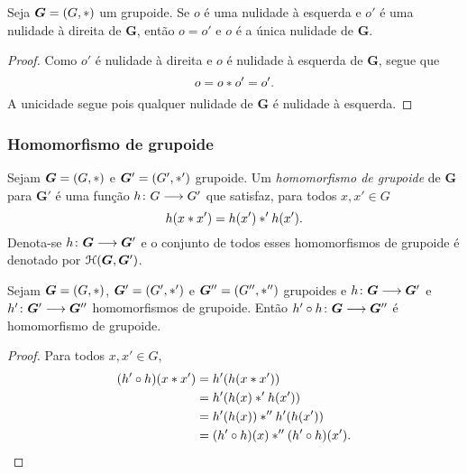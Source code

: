 \begin{proposition}
\label{prop:unic.nulidade}
Seja $\bm G = (G,\ast)$ um grupoide. Se $o$ é uma nulidade à esquerda e $o'$ é uma nulidade à direita de $\bm G$, então $o = o'$ e $o$ é a única nulidade de $\bm G$.
\end{proposition}
\begin{proof}
Como $o'$ é nulidade à direita e $o$ é nulidade à esquerda de $\bm G$, segue que
	\begin{equation*}
	o = o \ast o' = o'.
	\end{equation*}
A unicidade segue pois qualquer nulidade de $\bm G$ é nulidade à esquerda.
\end{proof}



\subsubsection{Homomorfismo de grupoide}

\begin{definition}
Sejam $\bm G=(G,\ast)$ e $\bm G'=(G',\ast')$ grupoide. Um \emph{homomorfismo de grupoide} de $\bm G$ para $\bm G'$ é uma função ${h}\colon {G} \longrightarrow {G'}$ que satisfaz, para todos $x,x' \in G$
	\begin{equation*}
	h(x \ast x')=h(x') \ast' h(x').
	\end{equation*}
Denota-se ${h}\colon {\bm G} \longrightarrow {\bm G'}$ e o conjunto de todos esses homomorfismos de grupoide é denotado por $\mathcal{H}(\bm G,\bm G')$.
\end{definition}

\begin{proposition}
\label{comp.hom.grupoide}
Sejam $\bm G=(G,\ast)$, $\bm G'=(G',\ast')$ e $\bm G''=(G'',\ast'')$ grupoides e ${h}\colon {\bm G } \longrightarrow {\bm G'}$ e ${h'}\colon {\bm G'} \longrightarrow {\bm G''}$ homomorfismos de grupoide. Então ${h' \circ h}\colon {\bm G} \longrightarrow {\bm G''}$ é homomorfismo de grupoide.
\end{proposition}
\begin{proof}
Para todos $x,x' \in G$,
	\begin{align*}
	(h' \circ h)(x \ast x') &= h'(h(x \ast x')) \\
		&= h'(h(x) \ast' h(x')) \\
		&= h'(h (x)) \ast'' h'(h(x')) \\
		&= (h' \circ h)(x) \ast'' (h' \circ h)(x').
		\qedhere
	\end{align*}
\end{proof}

